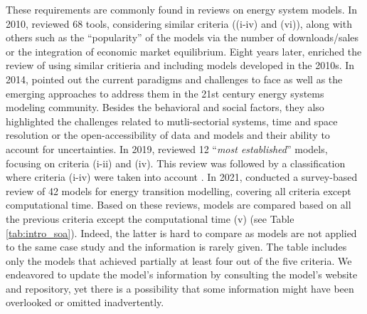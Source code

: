 These requirements are commonly found in reviews on energy system models. In 2010, \citet{Connolly2010} reviewed 68 tools, considering similar criteria (\ie (i-iv) and (vi)), along with others such as the ``popularity'' of the models via the number of downloads/sales or the integration of economic market equilibrium. Eight years later, \citet{lopion2018review} enriched the review of \citet{Connolly2010} using similar critieria and including models developed in the 2010s. In 2014, \citet{pfenninger2014energy} pointed out the current paradigms and challenges to face as well as the emerging approaches to address them in the 21st century energy systems modeling community.  Besides the behavioral and social factors, they also highlighted the challenges related to mutli-sectorial systems, time and space resolution or the open-accessibility of data and models and their ability to account for uncertainties. In 2019, \citet{prina2019transition} reviewed 12 ``\emph{most established}'' models, focusing on criteria (i-ii) and (iv). This review was followed by a classification where criteria (i-iv) were taken into account \cite{prina2020classification}. In 2021, \citet{chang2021trends} conducted a survey-based review of 42 models for energy transition modelling, covering all criteria except computational time.
Based on these reviews, models are compared based on all the previous criteria except the computational time (v) (see Table \ref{tab:intro_soa}). Indeed, the latter is hard to compare as models are not applied to the same case study and the information is rarely given. The table includes only the models that achieved partially at least four out of the five criteria. We endeavored to update the model's information by consulting the model's website and repository, yet there is a possibility that some information might have been overlooked or omitted inadvertently.

